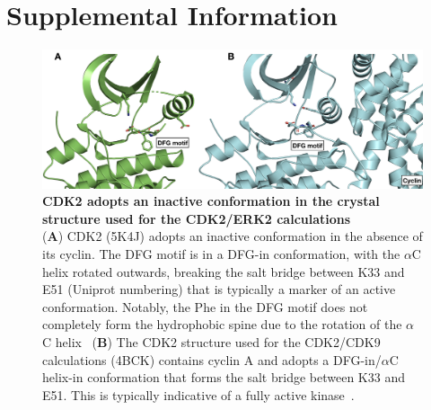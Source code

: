 \documentclass[9pt,lineno]{elife-modified} %
\begin{document}
%
\newpage
%






%
%
%



%
%
\newpage
%
%





%
%
%
%
%
%
\newpage
\section{Supplemental Information}
\setcounter{figure}{0} 
\renewcommand{\figurename}{Supplemental Figure.}

\begin{figure}[h]
\begin{fullwidth}
\begin{centering}
\includegraphics[width=1.0\linewidth]{figures/supp_figure1.png}
\end{centering}
\caption{
\label{fig:sup-figure-1}
{\bf CDK2 adopts an inactive conformation in the crystal structure used for the CDK2/ERK2 calculations} \\
({\bf A}) CDK2 (5K4J) adopts an inactive conformation in the absence of its cyclin. The DFG motif is in a DFG-in conformation, with the $\alpha$C helix rotated outwards, breaking the salt bridge between K33 and E51 (Uniprot numbering) that is typically a marker of an active conformation. Notably, the Phe in the DFG motif does not completely form the hydrophobic spine due to the rotation of the $\alpha$C helix~\citep{Hu:2015kh}
({\bf B}) The CDK2 structure used for the CDK2/CDK9 calculations (4BCK) contains cyclin A and adopts a DFG-in/$\alpha$C helix-in conformation that forms the salt bridge between K33 and E51. This is typically indicative of a fully active kinase~\citep{Huse2002-ml,Hari:2013dp}. 
}
\end{fullwidth}
\end{figure}
\end{document}
